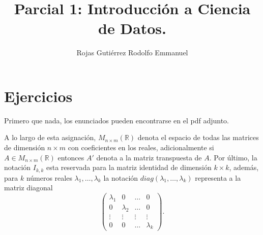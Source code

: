 \documentclass[10.5pt,notitlepage]{article}
\title{Parcial 1: Introducción a Ciencia de Datos.}
\author{Rojas Gutiérrez Rodolfo Emmanuel}
\renewcommand{\qedsymbol}{$\blacksquare$}
\newcommand{\RR}{\mathbb{R}}
\newcommand{\Matrix}[1]{\begin{pmatrix} #1 \end{pmatrix}}
\theoremstyle{plain}
\newenvironment{rem}
  {\pushQED{\qed}\renewcommand{\qedsymbol}{$\triangle$}\remarkex}
  {\popQED\endremarkex}
\begin{document}
\maketitle
\section{Ejercicios}

\setcounter{exo}{0}
Primero que nada, los enunciados pueden encontrarse en el pdf adjunto. 

\begin{rem}
A lo largo de esta asignación, \(M_{n\times m}(\RR)\) denota el espacio de todas las matrices de dimensión \(n\times m\) con coeficientes en los reales, adicionalmente si \(A \in M_{n\times m}(\RR)\) entonces \(A'\) denota a la matriz transpuesta de \(A\). Por último, la notación \(I_{k,k}\) esta reservada para la matriz identidad de dimensión \(k\times k\), además, para \(k\) números reales \(\lambda_1, \hdots, \lambda_{k}\) la notación \(diag(\lambda_1, \hdots, \lambda_{k})\) representa a la matriz diagonal
\[
\Matrix{\lambda_1 & 0 & \hdots & 0\\
        0 & \lambda_2& \hdots & 0 \\
        \vdots& \vdots & \vdots & \vdots\\ 
        0& 0 &\hdots & \lambda_{k}}.
\]
\end{rem}
\begin{exo}

\end{exo}
\end{document}
